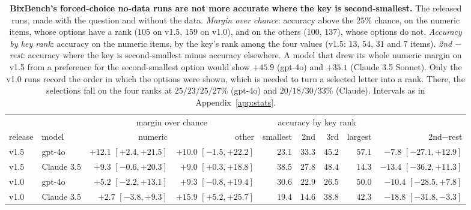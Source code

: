 \documentclass{article}
\begin{document}
\begin{table}[htbp]
\centering\footnotesize\setlength{\tabcolsep}{1.9pt}
\caption{\textbf{BixBench's forced-choice no-data runs are not more accurate where the key is second-smallest.} The
released runs, made with the question and without the data. \emph{Margin over chance}: accuracy above the $25\%$
chance, on the numeric items, whose options have a rank ($105$ on v1.5, $159$ on v1.0), and on the others ($100$,
$137$), whose options do not. \emph{Accuracy by key rank}: accuracy on the numeric items, by the key's rank among the
four values (v1.5: $13$, $54$, $31$ and $7$ items). \emph{2nd $-$ rest}: accuracy where the key is second-smallest
minus accuracy elsewhere. A model that drew its whole numeric margin on v1.5 from a preference for the second-smallest
option would show $+45.9$ (gpt-4o) and $+35.1$ (Claude 3.5 Sonnet). Only the v1.0 runs record the order in which the
options were shown, which is needed to turn a selected letter into a rank. There, the selections fall on the four ranks at $25/23/25/27\%$ (gpt-4o) and $20/18/30/33\%$
(Claude). Intervals as in Appendix~\ref{app:stats}.}
\label{tab:attribution}
\begin{tabular}{llrrrrrrr}
\toprule
& & \multicolumn{2}{c}{margin over chance} & \multicolumn{4}{c}{accuracy by key rank} & \\
\cmidrule(lr){3-4}\cmidrule(lr){5-8}
release & model & numeric & other & smallest & 2nd & 3rd & largest & 2nd$-$rest\\
\midrule
v1.5 & gpt-4o & $+12.1$ {\scriptsize$[+2.4,+21.5]$} & $+10.0$ {\scriptsize$[-1.5,+22.2]$} & $23.1$ & $33.3$ & $45.2$ & $57.1$ & $-7.8$ {\scriptsize$[-27.1,+12.9]$}\\
v1.5 & Claude 3.5 & $+9.3$ {\scriptsize$[-0.6,+20.3]$} & $+9.0$ {\scriptsize$[+0.3,+18.8]$} & $38.5$ & $27.8$ & $48.4$ & $14.3$ & $-13.4$ {\scriptsize$[-36.2,+11.3]$}\\
v1.0 & gpt-4o & $+5.2$ {\scriptsize$[-2.2,+13.1]$} & $+9.3$ {\scriptsize$[-0.8,+19.4]$} & $30.6$ & $22.9$ & $26.5$ & $50.0$ & $-10.4$ {\scriptsize$[-28.5,+7.8]$}\\
v1.0 & Claude 3.5 & $+2.7$ {\scriptsize$[-3.8,+9.3]$} & $+15.9$ {\scriptsize$[+5.2,+25.7]$} & $19.4$ & $14.6$ & $38.8$ & $42.3$ & $-18.8$ {\scriptsize$[-31.8,-3.3]$}\\
\bottomrule
\end{tabular}
\end{table}
\end{document}
